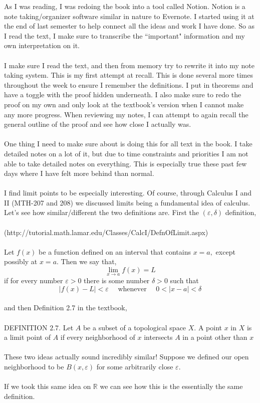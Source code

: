 \documentclass[10pt]{article}
\newcommand{\R}{\mathbb{R}}
\begin{document}
As I was reading, I was redoing the book into a tool called Notion. Notion is a note taking/organizer software similar in nature to Evernote. I started using it at the end of last semester to help connect all the ideas and work I have done. So as I read the text, I make sure to transcribe the ``important" information and my own interpretation on it.\\
\\
 I make sure I read the text, and then from memory try to rewrite it into my note taking system. This is my first attempt at recall. This is done several more times throughout the week to ensure I remember the definitions. I put in theorems and have a toggle with the proof hidden underneath. I also make sure to redo the proof on my own and only look at the textbook's version when I cannot make any more progress. When reviewing my notes, I can attempt to again recall the general outline of the proof and see how close I actually was. \\
\\
One thing I need to make sure about is doing this for all text in the book. I take detailed notes on a lot of it, but due to time constraints and priorities I am not able to take detailed notes on everything. This is especially true these past few days where I have felt more behind than normal.\\
\\
I find limit points to be especially interesting. Of course, through Calculus I and II (MTH-207 and 208) we discussed limits being a fundamental idea of calculus. Let's see how similar/different the two definitions are. First the $ (\varepsilon,\delta) $  definition,\\
\\
(http://tutorial.math.lamar.edu/Classes/CalcI/DefnOfLimit.aspx)\\
\\
Let $f(x)$ be a function defined on an interval that contains $x=a,$ except possibly at $x=a$. Then we say that,
$$
\lim _{x \rightarrow a} f(x)=L
$$
if for every number $\varepsilon>0$ there is some number $\delta>0$ such that
$$
|f(x)-L|<\varepsilon \quad \text { whenever } \quad 0<|x-a|<\delta
$$
\\
and then Definition 2.7 in the textbook,\\
\\
DEFINITION $2.7 .$ Let $A$ be a subset of a topological space $X .$ A point $x$ in $X$ is a limit point of $A$ if every neighborhood of $x$ intersects $A$ in a point other than $x$\\
\\
These two ideas actually sound incredibly similar! Suppose we defined our open neighborhood to be $ B(x,\varepsilon) $ for some arbitrarily close $ \varepsilon $. \\
\\
If we took this same idea on $ \R $ we can see how this is the essentially the same definition.
\newpage
\end{document}
